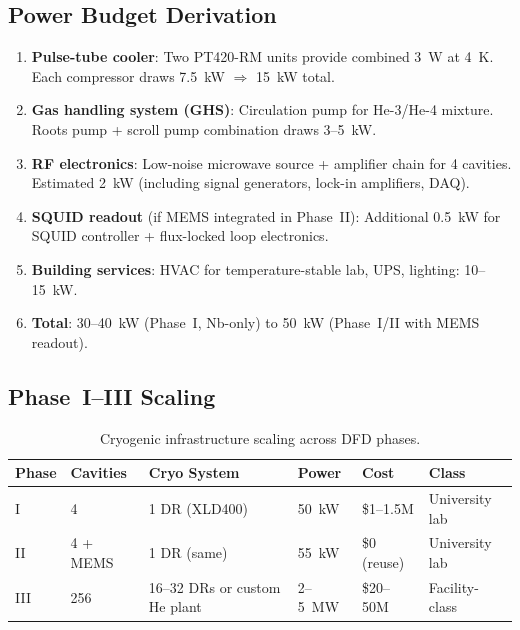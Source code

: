 \documentclass[11pt]{article}
\theoremstyle{definition}
\theoremstyle{remark}
\begin{document}
\subsection{Power Budget Derivation}

\begin{enumerate}
\item \textbf{Pulse-tube cooler}: Two PT420-RM units provide
  combined 3~W at 4~K. Each compressor draws 7.5~kW $\Rightarrow$
  15~kW total.

\item \textbf{Gas handling system (GHS)}: Circulation pump for
  He-3/He-4 mixture. Roots pump + scroll pump combination draws
  3--5~kW.

\item \textbf{RF electronics}: Low-noise microwave source + amplifier
  chain for 4 cavities. Estimated 2~kW (including signal generators,
  lock-in amplifiers, DAQ).

\item \textbf{SQUID readout} (if MEMS integrated in Phase~II):
  Additional 0.5~kW for SQUID controller + flux-locked loop
  electronics.

\item \textbf{Building services}: HVAC for temperature-stable lab,
  UPS, lighting: 10--15~kW.

\item \textbf{Total}: 30--40~kW (Phase~I, Nb-only) to 50~kW
  (Phase~I/II with MEMS readout).
\end{enumerate}

\subsection{Phase~I--III Scaling}

\begin{table}[H]
\centering
\caption{Cryogenic infrastructure scaling across DFD phases.}
\label{tab:cryo_scaling}
\renewcommand{\arraystretch}{1.3}
\begin{tabular}{p{2cm}p{2cm}p{2.5cm}p{2cm}p{2cm}p{2.5cm}}
\toprule
\textbf{Phase} & \textbf{Cavities} & \textbf{Cryo System} &
\textbf{Power} & \textbf{Cost} & \textbf{Class} \\
\midrule
I & 4 & 1 DR (XLD400) & 50~kW & \$1--1.5M & University lab \\
II & 4 + MEMS & 1 DR (same) & 55~kW & \$0 (reuse) & University lab \\
III & 256 & 16--32 DRs or custom He plant &
  2--5~MW & \$20--50M & Facility-class \\
\bottomrule
\end{tabular}
\end{table}
\end{document}
